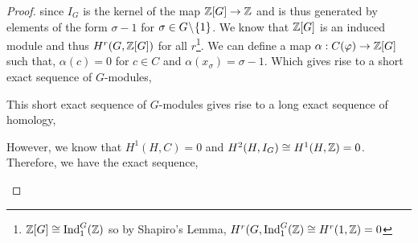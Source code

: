 \documentclass[12pt]{extarticle}
\begin{document}
\begin{enumerate}
\begin{proof}
since $I_G$ is the kernel of the map $\mathbb{Z}[G] \to \mathbb{Z}$ and is thus generated by elements of the form $\sigma - 1$ for $\sigma \in G \! \setminus \! \{1\}$. We know that $\mathbb{Z}[G]$ is an induced module and thus $H^r(G, \mathbb{Z}[G])$ for all $r$\footnote{$\mathbb{Z}[G] \cong \mathrm{Ind}^G_1(\mathbb{Z})$ so by Shapiro's Lemma, $H^r(G, \mathrm{Ind}^G_1(\mathbb{Z}) \cong H^r(1, \mathbb{Z}) = 0$}. We can define a map $\alpha : C(\varphi) \to \mathbb{Z}[G]$ such that, $\alpha(c) = 0$ for $c \in C$ and $\alpha(x_\sigma) = \sigma - 1$. Which gives rise to a short exact sequence of $G$-modules,
\begin{center}
\end{center}
This short exact sequence of $G$-modules gives rise to a long exact sequence of homology,
\begin{center}
\end{center}

However, we know that $H^1(H, C) = 0$ and $H^2(H, I_G) \cong H^1(H, \mathbb{Z}) = 0$. Therefore, we have the exact sequence,

\begin{center}
\end{center} 


\end{proof}
\end{enumerate}
\end{document}
